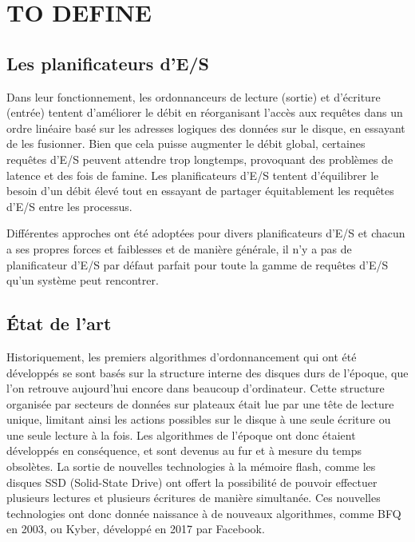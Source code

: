 \section{TO DEFINE}
\label{context}

\subsection{Les planificateurs d'E/S}

Dans leur fonctionnement, les ordonnanceurs de lecture (sortie) et d'écriture 
(entrée) tentent d'améliorer le débit en réorganisant l'accès aux requêtes dans 
un ordre linéaire basé sur les adresses logiques des données sur le disque, en 
essayant de les fusionner. Bien que cela puisse augmenter le débit global, 
certaines requêtes d'E/S peuvent attendre trop longtemps, provoquant des 
problèmes de latence et des fois de famine. Les planificateurs d'E/S tentent 
d'équilibrer le besoin d'un débit élevé tout en essayant de partager 
équitablement les requêtes d'E/S entre les processus.

Différentes approches ont été adoptées pour divers planificateurs d'E/S et 
chacun a ses propres forces et faiblesses et de manière générale, il n'y a pas 
de planificateur d'E/S par défaut parfait pour toute la gamme de requêtes d'E/S 
qu'un système peut rencontrer. 

\subsection{État de l'art}

Historiquement, les premiers algorithmes d'ordonnancement qui ont été 
développés se sont basés sur la structure interne des disques durs de l'époque, 
que l'on retrouve aujourd'hui encore dans beaucoup d'ordinateur. Cette 
structure organisée par secteurs de données sur plateaux était lue par une tête 
de lecture unique, limitant ainsi les actions possibles sur le disque à une 
seule écriture ou une seule lecture à la fois. Les algorithmes de l'époque ont 
donc étaient développés en conséquence, et sont devenus au fur et à mesure du 
temps obsolètes. La sortie de nouvelles technologies à la mémoire flash, comme 
les disques SSD (Solid-State Drive) ont offert la possibilité de pouvoir 
effectuer plusieurs lectures et plusieurs écritures de manière simultanée. Ces 
nouvelles technologies ont donc donnée naissance à de nouveaux algorithmes, 
comme BFQ en 2003, ou Kyber, développé en 2017 par Facebook.

